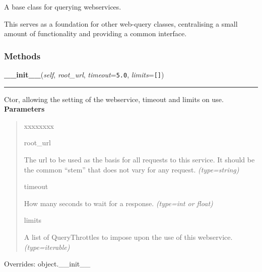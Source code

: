 A base class for querying webservices.

This serves as a foundation for other web-query classes, centralising a
small amount of functionality and providing a common interface.


  \subsubsection{Methods}

    \vspace{0.5ex}

\hspace{.8\funcindent}\begin{boxedminipage}{\funcwidth}

    \raggedright \textbf{\_\_init\_\_}(\textit{self}, \textit{root\_url}, \textit{timeout}={\tt 5.0}, \textit{limits}={\tt \texttt{[}\texttt{]}})

    \vspace{-1.5ex}

    \rule{\textwidth}{0.5\fboxrule}
\setlength{\parskip}{2ex}

Ctor, allowing the setting of the webservice, timeout and limits on use.
\setlength{\parskip}{1ex}
      \textbf{Parameters}
      \vspace{-1ex}

      \begin{quote}
        \begin{Ventry}{xxxxxxxx}

          \item[root\_url]


The url to be used as the basis for all requests to this service.
It should be the common ``stem'' that does not vary for any request.
            {\it (type=string)}

          \item[timeout]


How many seconds to wait for a response.
            {\it (type=int or float)}

          \item[limits]


A list of QueryThrottles to impose upon the use of this webservice.
            {\it (type=iterable)}

        \end{Ventry}

      \end{quote}

      Overrides: object.\_\_init\_\_

    \end{boxedminipage}

